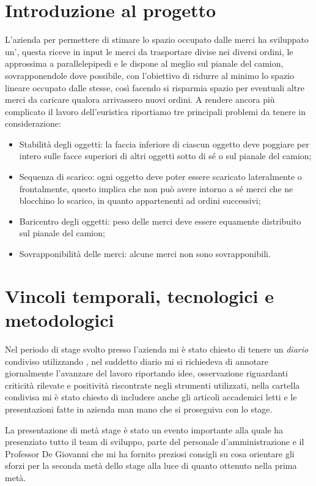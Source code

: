 \section{Introduzione al progetto}
L'azienda per permettere di stimare lo spazio occupato dalle merci ha sviluppato un', questa riceve in input le merci da trasportare divise nei diversi ordini, le approssima a parallelepipedi e le dispone al meglio sul pianale del camion, sovrapponendole dove possibile, con l'obiettivo di ridurre al minimo lo spazio lineare occupato dalle stesse, così facendo si risparmia spazio per eventuali altre merci da caricare qualora arrivassero nuovi ordini.
A rendere ancora più complicato il lavoro dell'euristica riportiamo tre principali problemi da tenere in considerazione:
\begin{itemize}
	\item Stabilità degli oggetti: la faccia inferiore di ciascun oggetto deve poggiare per intero sulle facce superiori di altri oggetti sotto di sé o sul pianale del camion;
	\item Sequenza di scarico: ogni oggetto deve poter essere scaricato lateralmente o frontalmente, questo implica che non può avere intorno a sé merci che ne blocchino lo scarico, in quanto appartenenti ad ordini successivi;
	\item Baricentro degli oggetti: peso delle merci deve essere equamente distribuito sul pianale del camion;
	\item Sovrapponibilità delle merci: alcune merci non sono sovrapponibili.
\end{itemize}

\section{Vincoli temporali, tecnologici e metodologici}
Nel periodo di stage svolto presso l'azienda mi è stato chiesto di tenere un \textit{diario} condiviso utilizzando , nel suddetto diario mi si richiedeva di annotare giornalmente l'avanzare del lavoro riportando idee, osservazione riguardanti criticità rilevate e positività riscontrate negli strumenti utilizzati, nella cartella condivisa mi è stato chiesto di includere anche gli articoli accademici letti e le presentazioni fatte in azienda man mano che si proseguiva con lo stage.

La presentazione di metà stage è stato un evento importante alla quale ha presenziato tutto il team di sviluppo, parte del personale d'amministrazione e il Professor De Giovanni che mi ha fornito preziosi consigli su cosa orientare gli sforzi per la seconda metà dello stage alla luce di quanto ottenuto nella prima metà.

